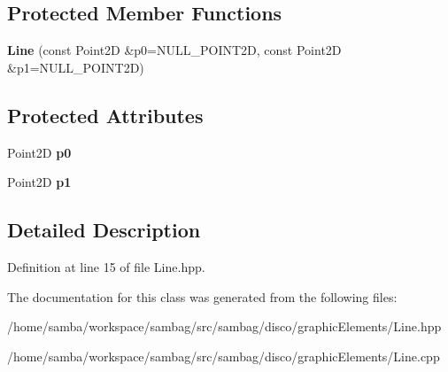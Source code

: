 \subsection*{Protected Member Functions}
\begin{DoxyCompactItemize}
\item 
\hypertarget{classsambag_1_1disco_1_1graphic_elements_1_1_line_a3b7d18298aa7c0e62904f8d468dbbbab}{
{\bfseries Line} (const Point2D \&p0=NULL\_\-POINT2D, const Point2D \&p1=NULL\_\-POINT2D)}
\label{classsambag_1_1disco_1_1graphic_elements_1_1_line_a3b7d18298aa7c0e62904f8d468dbbbab}

\end{DoxyCompactItemize}
\subsection*{Protected Attributes}
\begin{DoxyCompactItemize}
\item 
\hypertarget{classsambag_1_1disco_1_1graphic_elements_1_1_line_a2abb8091dcc27381c0543c0fd094b6ff}{
Point2D {\bfseries p0}}
\label{classsambag_1_1disco_1_1graphic_elements_1_1_line_a2abb8091dcc27381c0543c0fd094b6ff}

\item 
\hypertarget{classsambag_1_1disco_1_1graphic_elements_1_1_line_ab2c8d73e1dfe1d6a284c112e5e3abe7c}{
Point2D {\bfseries p1}}
\label{classsambag_1_1disco_1_1graphic_elements_1_1_line_ab2c8d73e1dfe1d6a284c112e5e3abe7c}

\end{DoxyCompactItemize}


\subsection{Detailed Description}


Definition at line 15 of file Line.hpp.



The documentation for this class was generated from the following files:\begin{DoxyCompactItemize}
\item 
/home/samba/workspace/sambag/src/sambag/disco/graphicElements/Line.hpp\item 
/home/samba/workspace/sambag/src/sambag/disco/graphicElements/Line.cpp\end{DoxyCompactItemize}
